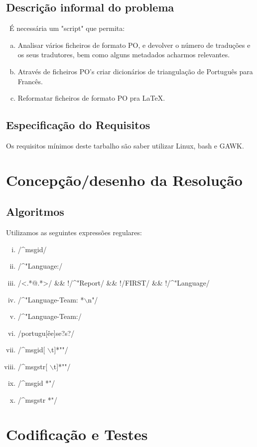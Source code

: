 \documentclass{report}
\begin{document}
\section{Descrição informal do problema}\
É necessária um "script" que permita:
\begin{enumerate}[a)]
\item Analisar vários ficheiros de formato PO, e devolver o número de traduções
e os seus tradutores, bem como alguns metadados acharmos relevantes.
\item Através de ficheiros PO's criar dicionários de triangulação de Português
para Francês.
\item Reformatar ficheiros de formato PO pra LaTeX.
\end{enumerate}

\section{Especificação do Requisitos}
Os requisitos mínimos deste tarbalho são saber utilizar Linux, bash e GAWK.

\chapter{Concepção/desenho da Resolução}
\section{Algoritmos}
Utilizamos as seguintes expressões regulares:

\begin{enumerate}[i)]
\item /\^{}msgid/
\item /\^{}"Language:/
\item /\textless.*@.*\textgreater/ \&\& !/\^{}"Report/ \&\& !/FIRST/ \&\& !/\^{}"Language/
\item /\^{}"Language-Team: *$\backslash$n"/
\item /\^{}"Language-Team:/
\item /portugu[êe]se?s?/
\item /\^{}msgid[ $\backslash$t]*""/
\item /\^{}msgstr[ $\backslash$t]*""/
\item /\^{}msgid *"/
\item /\^{}msgstr *"/
\end{enumerate}

\chapter{Codificação e Testes}
\end{document}
